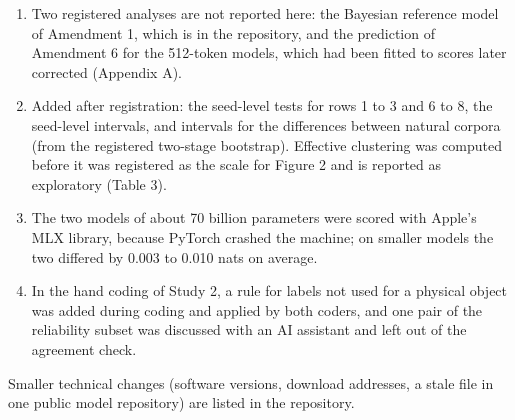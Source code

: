 \FloatBarrier
{}\label{app:B}
\setcounter{table}{0}\renewcommand{\thetable}{B\arabic{table}}
\setcounter{figure}{0}\renewcommand{\thefigure}{B\arabic{figure}}
\begin{enumerate}
\item Two registered analyses are not reported here: the Bayesian reference model of Amendment 1, which is in the repository, and the prediction of Amendment 6 for the 512-token models, which had been fitted to scores later corrected (Appendix A).
\item Added after registration: the seed-level tests for rows 1 to 3 and 6 to 8, the seed-level intervals, and intervals for the differences between natural corpora (from the registered two-stage bootstrap). Effective clustering was computed before it was registered as the scale for Figure 2 and is reported as exploratory (Table 3).
\item The two models of about 70 billion parameters were scored with Apple's MLX library, because PyTorch crashed the machine; on smaller models the two differed by 0.003 to 0.010 nats on average.
\item In the hand coding of Study 2, a rule for labels not used for a physical object was added during coding and applied by both coders, and one pair of the reliability subset was discussed with an AI assistant and left out of the agreement check.
\end{enumerate}

Smaller technical changes (software versions, download addresses, a stale file in one public model repository) are listed in the repository.

